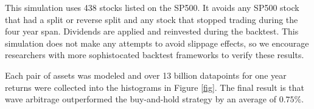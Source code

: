 \documentclass{article}
\begin{document}
This simulation uses 438 stocks listed on the SP500. It avoids any SP500 stock
that had a split or reverse split and any stock that stopped trading during the
four year span. Dividends are applied and reinvested during the backtest. This
simulation does not make any attempts to avoid slippage effects, so we
encourage researchers with more sophistocated backtest frameworks to verify
these results.

Each pair of assets was modeled and over 13 billion datapoints for one year
returns were collected into the histograms in Figure \ref{fig}. The final
result is that wave arbitrage outperformed the buy-and-hold strategy by an
average of $0.75\%$.



\end{document}
